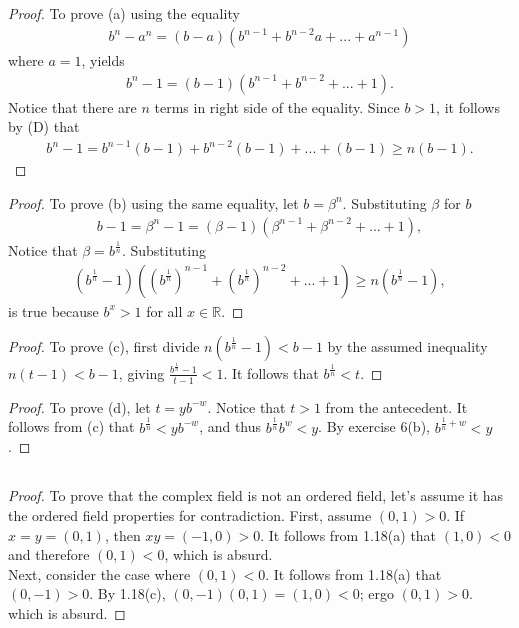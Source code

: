 \documentclass[12pt]{article}
\begin{document}
\subsection{}
\begin{proof}
				To prove (a) using the equality
				\begin{gather*}
								b^n-a^n=(b-a)(b^{n-1}+b^{n-2}a+...+a^{n-1})
				\end{gather*}
				where $a=1$, yields
				\begin{gather*}
								b^n-1=(b-1)(b^{n-1}+b^{n-2}+...+1).
				\end{gather*}
				Notice that there are $n$ terms in right side of the equality. Since $b>1$, 
				it follows by (D) that
				\begin{gather*}
								b^n-1=b^{n-1}(b-1)+b^{n-2}(b-1)+...+(b-1)\geq n(b-1).
				\end{gather*}
\end{proof}
\begin{proof}
				To prove (b) using the same equality, let $b=\beta^n$. 
				Substituting $\beta$ for $b$
				\begin{gather*}
								b-1=\beta^n-1=(\beta-1)(\beta^{n-1}+\beta^{n-2}+...+1),
				\end{gather*}
				Notice that $\beta = b^{\frac{1}{n}}$. Substituting
				\begin{gather*}
								(b^\frac{1}{n}-1)((b^\frac{1}{n})^{n-1}+(b^\frac{1}{n})^{n-2}+...+1)\geq
								n(b^\frac{1}{n}-1),
				\end{gather*}
				is true because $b^x>1$ for all $x\in\mathbb{R}$.
\end{proof}
\begin{proof}
				To prove (c), first divide $n(b^\frac{1}{n}-1)<b-1$ by the assumed inequality $n(t-1)<b-1$,
				giving $\frac{b^\frac{1}{n}-1}{t-1}<1$. It follows that $b^\frac{1}{n}<t$.
\end{proof}
\begin{proof}
				To prove (d), let $t=yb^{-w}$. Notice that $t>1$ from the antecedent. It follows from (c)
				that $b^\frac{1}{n}<yb^{-w}$, and thus $b^\frac{1}{n}b^w<y$. By exercise 6(b),
				$b^{\frac{1}{n}+w}<y$.
\end{proof}

\subsection{}
\begin{proof}
				To prove that the complex field is not an ordered field, let's assume it has the ordered
				field properties for contradiction. First, assume $(0,1)>0$. If $x=y=(0,1)$, then
				$xy=(-1,0)>0$. It follows from 1.18(a) that $(1,0)<0$ and therefore $(0,1)<0$,
				which is absurd.\\
				Next, consider the case where $(0,1)<0$. It follows from 1.18(a) that $(0,-1)>0$.
				By 1.18(c), $(0,-1)(0,1)=(1,0)<0$; ergo $(0,1)>0$. which is absurd.
\end{proof}
\end{document}
